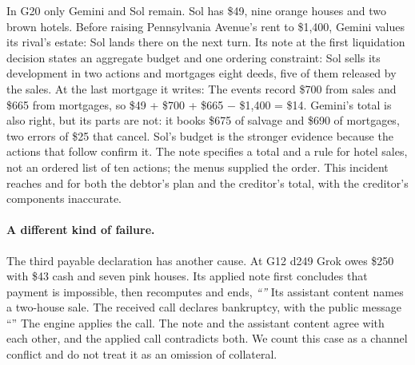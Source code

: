 In G20 only Gemini and Sol remain. Sol has \$49, nine orange houses and two brown hotels. Before raising Pennsylvania Avenue's rent to \$1,400, Gemini values its rival's estate:
Sol lands there on the next turn. Its note at the first liquidation decision states an aggregate budget and one ordering constraint:
Sol sells its development in two actions and mortgages eight deeds, five of them released by the sales. At the last mortgage it writes:
The events record \$700 from sales and \$665 from mortgages, so \$49 + \$700 + \$665 $-$ \$1,400 = \$14. Gemini's total is also right, but its parts are not: it books \$675 of salvage and \$690 of mortgages, two errors of \$25 that cancel. Sol's budget is the stronger evidence because the actions that follow confirm it. The note specifies a total and a rule for hotel sales, not an ordered list of ten actions; the menus supplied the order. This incident reaches  and  for both the debtor's plan and the creditor's total, with the creditor's components inaccurate.

\paragraph{A different kind of failure.} The third payable declaration has another cause. At G12 d249 Grok owes \$250 with \$43 cash and seven pink houses. Its applied note first concludes that payment is impossible, then recomputes and ends, \emph{``''} Its assistant content names a two-house sale. The received call declares bankruptcy, with the public message ``'' The engine applies the call. The note and the assistant content agree with each other, and the applied call contradicts both. We count this case as a channel conflict and do not treat it as an omission of collateral.
